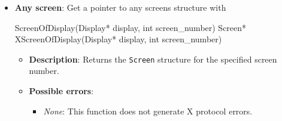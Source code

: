 \documentclass{report}
\begin{document}
\begin{itemize}
\begin{itemize}
            \end{itemize}
            The default screen is usually screen 0. On display zero, the display string would be $:0.0$
            \bigbreak \noindent 
            Get a pointer to the default screen structure with
            \bigbreak \noindent 
            \begin{cppcode}
                \begin{cppcode}
                    DefaultScreenOfDisplay(Display* display)
                    Screen* XDefaultScreenOfDisplay(Display* display)
                \end{cppcode}
                \begin{itemize}
                    \item \textbf{Description}: Returns a pointer to the default \texttt{Screen} structure for the display.
                    \item \textbf{Possible errors}:
                        \begin{itemize}
                            \item \textit{None}: This function does not generate X protocol errors.
                        \end{itemize}
                \end{itemize}
            \end{cppcode}
        \item \textbf{Any screen}: Get a pointer to any screens structure with
            \bigbreak \noindent 
            \begin{cppcode}
                ScreenOfDisplay(Display* display, int screen_number)
                Screen* XScreenOfDisplay(Display* display, int screen_number)
            \end{cppcode}
            \begin{itemize}
                \item \textbf{Description}: Returns the \texttt{Screen} structure for the specified screen number.
                \item \textbf{Possible errors}:
                    \begin{itemize}
                        \item \textit{None}: This function does not generate X protocol errors.
                    \end{itemize}
            \end{itemize}



    \end{itemize}
\end{document}
